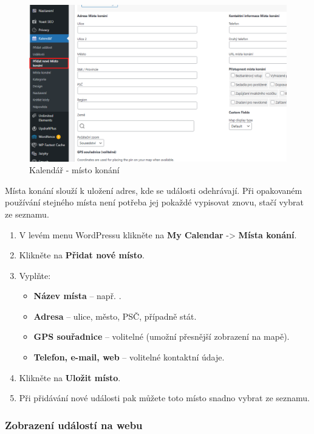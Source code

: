 \documentclass[12pt,a4paper]{article}
\begin{document}
	
	\begin{figure}[htp]
		\centering
		\includegraphics[width=15cm]{WPcalendarLocationCreate.png}
		\caption{Kalendář - místo konání}
		\label{fig:role}
	\end{figure}
	
	
	Místa konání slouží k uložení adres, kde se události odehrávají. Při opakovaném používání stejného místa není potřeba jej pokaždé vypisovat znovu, stačí vybrat ze seznamu.
	
	\begin{enumerate}
		\item V levém menu WordPressu klikněte na \textbf{My Calendar} -> \textbf{Místa konání}.
		\item Klikněte na \textbf{Přidat nové místo}.
		\item Vyplňte:
		\begin{itemize}
			\item \textbf{Název místa} – např. .
			\item \textbf{Adresa} – ulice, město, PSČ, případně stát.
			\item \textbf{GPS souřadnice} – volitelné (umožní přesnější zobrazení na mapě).
			\item \textbf{Telefon, e-mail, web} – volitelné kontaktní údaje.
		\end{itemize}
		\item Klikněte na \textbf{Uložit místo}.
		\item Při přidávání nové události pak můžete toto místo snadno vybrat ze seznamu.
	\end{enumerate}
	
	\subsubsection{Zobrazení událostí na webu}
	
\end{document}

